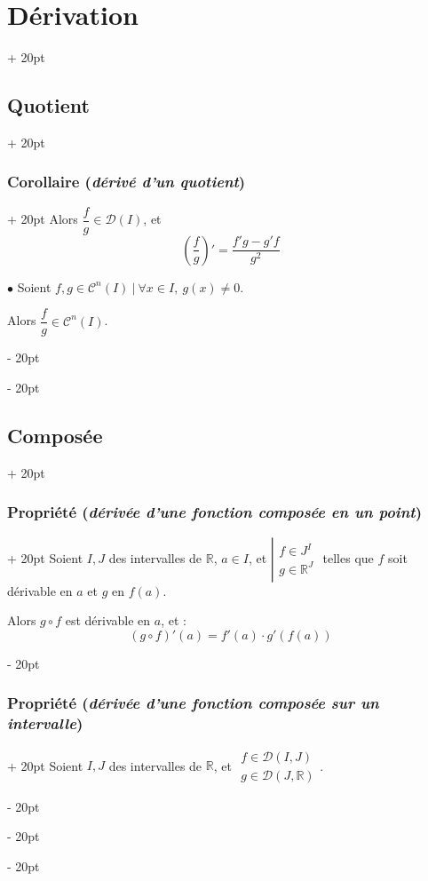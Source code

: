 \documentclass[a4paper, 12pt, twoside]{article}
\newcommand{\R}{\mathbb{R}} %
\newcommand{\lr}[1]{\left( #1 \right)}
\newcommand{\ind}[1][20pt]{\advance\leftskip + #1}
\newcommand{\deind}[1][20pt]{\advance\leftskip - #1}
\newenvironment{indt}[2][20pt]{#2 \par \ind[#1]}{\par \deind} %
\begin{document}
\begin{indt}{\section{Dérivation}}
\begin{indt}{\subsection{Quotient}}
\begin{indt}{\subsubsection{Corollaire (\textit{dérivé d'un quotient})}}
                Alors $\dfrac f g \in \mathcal D(I)$, et
                \[
                    \lr{\dfrac f g}' = \dfrac{f'g - g'f}{g^2}
                \]

                \vspace{12pt}
                
                $\bullet$ Soient $f, g \in \mathcal C^n(I)\ |\ \forall x \in I,\ g(x) \neq 0$.

                Alors $\dfrac f g \in \mathcal C^n(I)$.
            \end{indt}
        \end{indt}

        \vspace{12pt}
        
        \begin{indt}{\subsection{Composée}}
            \begin{indt}{\subsubsection{Propriété (\textit{dérivée d'une fonction composée en un point})}}
                Soient $I, J$ des intervalles de $\R$, $a \in I$, et
                $
                    \left| \!
                    \begin{array}{l}
                        f \in J^I
                        \\
                        g \in \R^J
                    \end{array}
                    \right.
                $
                telles que $f$ soit dérivable en $a$ et $g$ en $f(a)$.

                Alors $g \circ f$ est dérivable en $a$, et :
                \[
                    (g \circ f)'(a) = f'(a) \cdot g'\!\lr{f(a)}
                \]
            \end{indt}

            \vspace{12pt}
            
            \begin{indt}{\subsubsection{Propriété (\textit{dérivée d'une fonction composée sur un intervalle})}}
                Soient $I, J$ des intervalles de $\R$, et
                $
                    \begin{array}{|l}
                        f \in \mathcal D(I, J)
                        \\
                        g \in \mathcal D(J, \R)
                    \end{array}
                $.


\end{indt}
\end{indt}
\end{indt}
\end{document}
